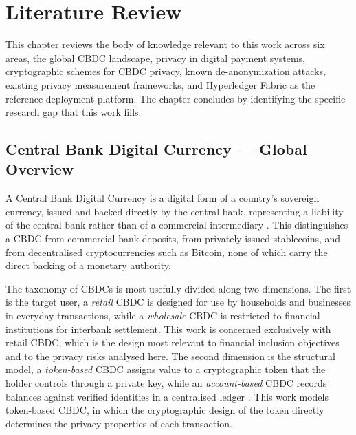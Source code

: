 
\chapter{Literature Review}
\label{ch:literature}

This chapter reviews the body of knowledge relevant to this
work across six areas, the global CBDC landscape, privacy
in digital payment systems, cryptographic schemes for CBDC
privacy, known de-anonymization attacks, existing privacy
measurement frameworks, and Hyperledger Fabric as the
reference deployment platform. The chapter concludes by
identifying the specific research gap that this work fills.

\section{Central Bank Digital Currency --- Global Overview}
\label{sec:cbdc_global}

A Central Bank Digital Currency is a digital form of a
country's sovereign currency, issued and backed directly by
the central bank, representing a liability of the central bank
rather than of a commercial intermediary
\cite{mancinigrifoli2018}. This distinguishes a CBDC from
commercial bank deposits, from privately issued stablecoins,
and from decentralised cryptocurrencies such as Bitcoin, none
of which carry the direct backing of a monetary authority.

The taxonomy of CBDCs is most usefully divided along two
dimensions. The first is the target user, a \textit{retail}
CBDC is designed for use by households and businesses in
everyday transactions, while a \textit{wholesale} CBDC is
restricted to financial institutions for interbank settlement.
This work is concerned exclusively with retail CBDC, which
is the design most relevant to financial inclusion objectives
and to the privacy risks analysed here. The second dimension
is the structural model, a \textit{token-based} CBDC assigns
value to a cryptographic token that the holder controls
through a private key, while an \textit{account-based} CBDC
records balances against verified identities in a centralised
ledger \cite{biscgide2024}. This work models token-based
CBDC, in which the cryptographic design of the token directly
determines the privacy properties of each transaction.

